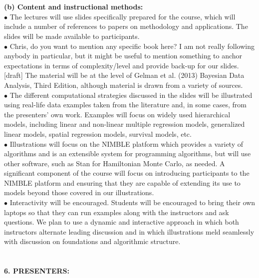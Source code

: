 \documentclass[11pt]{article}
\begin{document}
\\
\\
{\bf (b) Content and instructional methods:}\\
$\bullet$ The lectures will use slides specifically prepared for the course, which will include a number of references to papers on methodology and applications.  The slides will be made available to participants. \\
$\bullet$ {\color{red} Chris, do you want to mention any specific book here?  I am not really following anybody in particular, but it might be useful to mention something to anchor expectations in terms of complexity/level and provide back-up for our slides.} \\
{\color{blue} [draft] The material will be at the level of Gelman et al. (2013) Bayesian Data Analysis, Third Edition, although material is drawn from a variety of sources.} \\
$\bullet$ The different computational strategies discussed in the slides will be illustrated using real-life data examples taken from the literature and, in some cases, from the presenters' own work.  Examples will focus on widely used hierarchical models, including linear and non-linear multiple regression models, generalized linear models, spatial regression models, {\color{blue} survival models}, etc. \\
$\bullet$ Illustrations will focus on the NIMBLE platform which provides a variety of algorithms and is an extensible system for programming algorithms, but will use other software, such as Stan for Hamiltonian Monte Carlo, as needed.  A significant component of the course will focus on introducing participants to the NIMBLE platform and ensuring that they are capable of extending its use to models beyond those covered in our illustrations. \\
$\bullet$ Interactivity will be encouraged.  Students will be encouraged to bring their own laptops so that they can run examples along with the instructors and ask questions.  We plan to use a dynamic and interactive approach in which both instructors alternate leading discussion and in which illustrations meld seamlessly with discussion on foundations and algorithmic structure.\\
\\
\\
{\large {\bf 6. PRESENTERS:}}\\
\\
\end{document}
